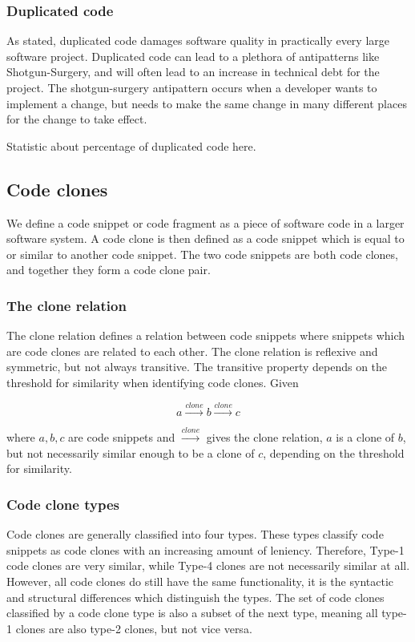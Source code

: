 \documentclass[12pt]{article}
\begin{document}
\subsubsection{Duplicated code}

As stated, duplicated code damages software quality in practically every large software
project. Duplicated code can lead to a plethora of antipatterns like Shotgun-Surgery, and
will often lead to an increase in technical debt for the
project\cite[99]{fowlerrefactoring}. The shotgun-surgery antipattern occurs when a
developer wants to implement a change, but needs to make the same change in many different
places for the change to take effect.

Statistic about percentage of duplicated code here.

\subsection{Code clones}

We define a code snippet or code fragment as a piece of software code in a larger software
system. A code clone is then defined as a code snippet which is equal to or similar to
another code snippet. The two code snippets are both code clones, and together they form a
code clone pair.

\subsubsection{The clone relation}
The clone relation defines a relation between code snippets where snippets which are
code clones are related to each other. The clone relation is reflexive and symmetric, but
not always transitive. The transitive property depends on the threshold for similarity when
identifying code clones. Given

$$a \xrightarrow{clone} b \xrightarrow{clone} c$$

where $a,b,c$ are code snippets and $\xrightarrow{clone}$ gives the clone relation, $a$ is
a clone of $b$, but not necessarily similar enough to be a clone of $c$, depending on the
threshold for similarity.

\subsubsection{Code clone types}

Code clones are generally classified into four types\cite{Inoue_introduction_to_cc}. These
types classify code snippets as code clones with an increasing amount of leniency.
Therefore, Type-1 code clones are very similar, while Type-4 clones are not necessarily
similar at all. However, all code clones do still have the same functionality, it is the
syntactic and structural differences which distinguish the types. The set of code clones
classified by a code clone type is also a subset of the next type, meaning all type-1
clones are also type-2 clones, but not vice versa.
\end{document}

